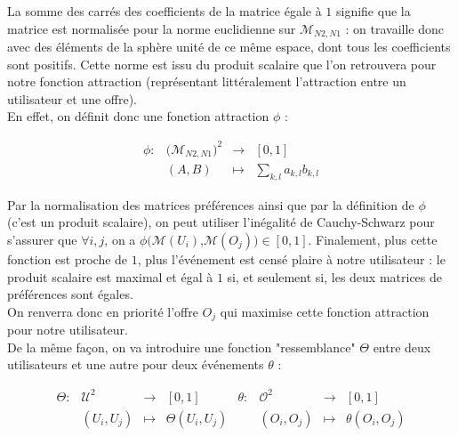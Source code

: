 \documentclass[11pt, oneside]{article}
\begin{document}
La somme des carrés des coefficients de la matrice égale à $1$ signifie que la matrice est normalisée pour la norme euclidienne sur $\mathcal{M}_{N2,N1} $ : on travaille donc avec des éléments de la sphère unité de ce même espace, dont tous les coefficients sont positifs. Cette norme est issu du produit scalaire  que l'on retrouvera pour notre fonction attraction (représentant littéralement l'attraction entre un utilisateur et une offre). \\

En effet, on définit donc une fonction attraction $\phi$ :

\begin{center}
\[
\begin{array}{l|rcl}
\phi : & \big( \mathcal{M}_{N2,N1} \big)^{2} & \longrightarrow & [0,1] \\
    & (A,B) & \longmapsto & \displaystyle \sum _{k,l} a_{k,l}b_{k,l} \end{array}
\]

\end{center}

Par la normalisation des matrices préférences ainsi que par la définition de $\phi$ (c'est un produit scalaire), on peut utiliser l'inégalité de Cauchy-Schwarz pour s'assurer que $\forall i,j$, on a $\phi (\mathcal{M} (U_i)$,$\mathcal{M} (O_j)) \in [0,1]$. Finalement, plus cette fonction est proche de $1$, plus l'événement est censé plaire à notre utilisateur : le produit scalaire est maximal et égal à $1$ si, et seulement si, les deux matrices de préférences sont égales. \\ On renverra donc en priorité l'offre $O_j$ qui maximise cette fonction attraction pour notre utilisateur.  \\

De la même façon, on va introduire une fonction "ressemblance" $\Theta$ entre deux utilisateurs et une autre pour deux événements $\theta$ :

\begin{center}
\[
\begin{array}{l|rcl}
\Theta : &  \mathcal{U}^{2} & \longrightarrow & [0,1] \\
    & (U_i,U_j) & \longmapsto & \Theta (U_i,U_j) \end{array}
\begin{array}{l|rcl}
\theta : & \mathcal{O}^{2} & \longrightarrow & [0,1] \\
    & (O_i,O_j) & \longmapsto & \theta (O_i,O_j) \end{array}
\]
\end{center}
\end{document}
